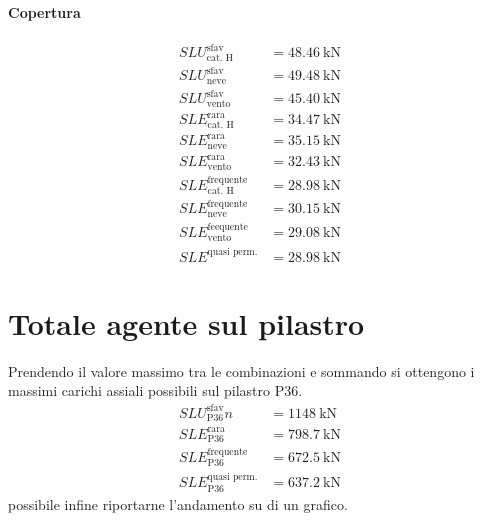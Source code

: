 \paragraph*{Copertura} 
\begin{align*} 
	SLU^{\text{sfav}}_{\text{cat. H}}		&= \SI{48.46}{\kilo\newton} \\
	SLU^{\text{sfav}}_{\text{neve}}	 	    &= \SI{49.48}{\kilo\newton} \\
	SLU^{\text{sfav}}_{\text{vento}}		&= \SI{45.40}{\kilo\newton} \\	
	SLE^{\text{rara}}_{\text{cat. H}} 		&= \SI{34.47}{\kilo\newton} \\
	SLE^{\text{rara}}_{\text{neve}} 		&= \SI{35.15}{\kilo\newton} \\
	SLE^{\text{rara}}_{\text{vento}} 		&= \SI{32.43}{\kilo\newton} \\
	SLE^{\text{frequente}}_{\text{cat. H}} 	&= \SI{28.98}{\kilo\newton} \\
	SLE^{\text{frequente}}_{\text{neve}} 	&= \SI{30.15}{\kilo\newton} \\
	SLE^{\text{feequente}}_{\text{vento}}   &= \SI{29.08}{\kilo\newton} \\
	SLE^{\text{quasi perm.}}                &= \SI{28.98}{\kilo\newton}
\end{align*}

\section{Totale agente sul pilastro}
Prendendo il valore massimo tra le combinazioni e sommando si ottengono i massimi carichi assiali possibili sul pilastro P36.
\begin{align*} 
	SLU^{\text{sfav}}_{\text{P36}}		n&= \SI{1148}{\kilo\newton} \\	
	SLE^{\text{rara}}_{\text{P36}} 		 &= \SI{798.7}{\kilo\newton} \\
	SLE^{\text{frequente}}_{\text{P36}}  &= \SI{672.5}{\kilo\newton} \\
	SLE^{\text{quasi perm.}}_{\text{P36}}&= \SI{637.2}{\kilo\newton}
\end{align*}
\e possibile infine riportarne l'andamento su di un grafico.

